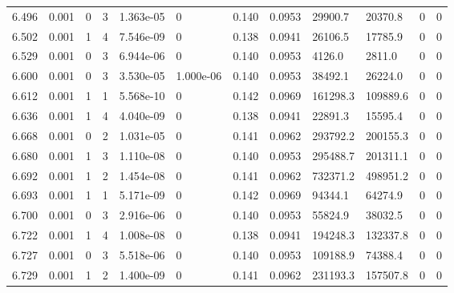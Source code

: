 \documentclass[preview]{standalone}
\begin{document}
{{{{{{{{{\begin{tabular}{L{1.2cm}C{1.2cm} C{0.3cm}C{0.5cm} C{1.4cm}C{1.4cm} C{1.4cm}C{1.4cm} C{1.6cm}C{1.6cm} C{1.6cm}C{1.6cm}}
  6.496  &  0.001  & 0     &  3 &  1.363e-05  & 0  &  0.140&   0.0953& 29900.7 & 20370.8   &  0 & 0  \\ 
  6.502  &  0.001  & 1     &  4 &  7.546e-09  & 0  &  0.138&   0.0941& 26106.5 & 17785.9   &  0 & 0  \\ 
  6.529  &  0.001  & 0     &  3 &  6.944e-06  & 0  &  0.140&   0.0953& 4126.0 & 2811.0   &  0 & 0  \\ 
  6.600  &  0.001  & 0     &  3 &  3.530e-05  & 1.000e-06  &  0.140&   0.0953& 38492.1 & 26224.0   &  0 & 0  \\ 
  6.612  &  0.001  & 1     &  1 &  5.568e-10  & 0  &  0.142&   0.0969& 161298.3 & 109889.6   &  0 & 0  \\ 
  6.636  &  0.001  & 1     &  4 &  4.040e-09  & 0  &  0.138&   0.0941& 22891.3 & 15595.4   &  0 & 0  \\ 
  6.668  &  0.001  & 0     &  2 &  1.031e-05  & 0  &  0.141&   0.0962& 293792.2 & 200155.3   &  0 & 0  \\ 
  6.680  &  0.001  & 1     &  3 &  1.110e-08  & 0  &  0.140&   0.0953& 295488.7 & 201311.1   &  0 & 0  \\ 
  6.692  &  0.001  & 1     &  2 &  1.454e-08  & 0  &  0.141&   0.0962& 732371.2 & 498951.2   &  0 & 0  \\ 
  6.693  &  0.001  & 1     &  1 &  5.171e-09  & 0  &  0.142&   0.0969& 94344.1 & 64274.9   &  0 & 0  \\ 
  6.700  &  0.001  & 0     &  3 &  2.916e-06  & 0  &  0.140&   0.0953& 55824.9 & 38032.5   &  0 & 0  \\ 
  6.722  &  0.001  & 1     &  4 &  1.008e-08  & 0  &  0.138&   0.0941& 194248.3 & 132337.8   &  0 & 0  \\ 
  6.727  &  0.001  & 0     &  3 &  5.518e-06  & 0  &  0.140&   0.0953& 109188.9 & 74388.4   &  0 & 0  \\ 
  6.729  &  0.001  & 1     &  2 &  1.400e-09  & 0  &  0.141&   0.0962& 231193.3 & 157507.8   &  0 & 0  \\ 
\hline 
\end{tabular} 

}}}}}}}}}
\end{document}
